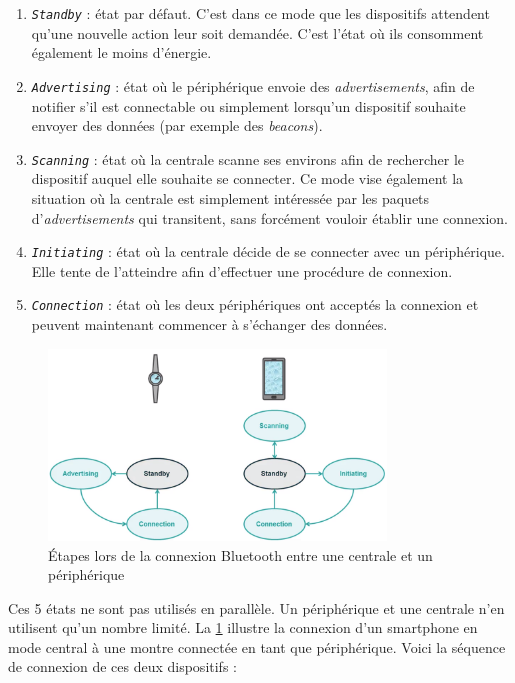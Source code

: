 \begin{enumerate}
    \item \texttt{\textit{Standby}} : état par défaut. C'est dans ce mode que les dispositifs attendent qu'une nouvelle action leur soit demandée. C'est l'état où ils consomment également le moins d'énergie.
    \item \texttt{\textit{Advertising}} : état où le périphérique envoie des \textit{advertisements}, afin de notifier s'il est connectable ou simplement lorsqu'un dispositif souhaite envoyer des données (par exemple des \textit{beacons}).
    \item \texttt{\textit{Scanning}} : état où la centrale scanne ses environs afin de rechercher le dispositif auquel elle souhaite se connecter. Ce mode vise également la situation où la centrale est simplement intéressée par les paquets d'\textit{advertisements} qui transitent, sans forcément vouloir établir une connexion.
    \item \texttt{\textit{Initiating}} : état où la centrale décide de se connecter avec un périphérique. Elle tente de l'atteindre afin d'effectuer une procédure de connexion.
    \item \texttt{\textit{Connection}} : état où les deux périphériques ont acceptés la connexion et peuvent maintenant commencer à s'échanger des données.
\end{enumerate}

\begin{figure}[ht!]
    \centering
    \includegraphics[width=0.8\textwidth]{Figures/Protocols/Bluetooth/states_while_connecting.PNG}
    \caption{Étapes lors de la connexion Bluetooth entre une centrale et un périphérique}
    \label{fig-states_while_connecting}
\end{figure}

Ces 5 états ne sont pas utilisés en parallèle. Un périphérique et une centrale n'en utilisent qu'un nombre limité. La \cref{fig-states_while_connecting} illustre la connexion d'un smartphone en mode central à une montre connectée en tant que périphérique. Voici la séquence de connexion de ces deux dispositifs : 

